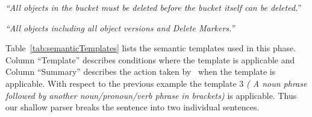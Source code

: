 \begin{center}
\scriptsize \textit{``All objects in the bucket must be deleted before the bucket itself can be deleted.}''
	
\textit{``All objects including all object versions and Delete Markers.''}\normalsize 
\end{center} 


Table~\ref{tab:semanticTemplates} lists the semantic templates used in this phase.
Column ``Template'' describes conditions where the template is applicable and Column ``Summary'' describes the action taken by \tool\ when the template is applicable.
With respect to the previous example the template 3 \textit{( A noun phrase followed by another noun/pronoun/verb phrase in brackets)} is applicable.
Thus our shallow parser breaks the sentence into two individual sentences.
	 
